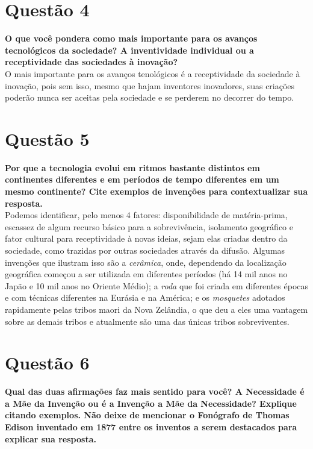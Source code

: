 
\section{Questão 4}
\label{sec:q4}
\textbf{O que você pondera como mais importante para os avanços tecnológicos da sociedade? A inventividade individual ou a receptividade das sociedades à inovação?} \\

O mais importante para os avanços tenológicos é a receptividade da sociedade à inovação, pois sem isso, mesmo que hajam inventores inovadores, suas criações poderão nunca ser aceitas pela sociedade e se perderem no decorrer do tempo.


\section{Questão 5}
\label{sec:q5}
\textbf{Por que a tecnologia evolui em ritmos bastante distintos em continentes diferentes e em períodos de tempo diferentes em um mesmo continente? Cite exemplos de invenções para contextualizar sua resposta.} \\

Podemos identificar, pelo menos 4 fatores: disponibilidade de matéria-prima, escassez de algum recurso básico para a sobrevivência, isolamento geográfico e fator cultural para receptividade à novas ideias, sejam elas criadas dentro da sociedade, como trazidas por outras sociedades através da difusão. Algumas invenções que ilustram isso são a \textit{cerâmica}, onde, dependendo da localização geográfica começou a ser utilizada em diferentes períodos (há 14 mil anos no Japão e 10 mil anos no Oriente Médio); a \textit{roda} que foi criada em diferentes épocas e com técnicas diferentes na Eurásia e na América; e os \textit{mosquetes} adotados rapidamente pelas tribos maori da Nova Zelândia, o que deu a eles uma vantagem sobre as demais tribos e atualmente são uma das únicas tribos sobreviventes.


\section{Questão 6}
\label{sec:q6}
\textbf{Qual das duas afirmações faz mais sentido para você? A Necessidade é a Mãe da Invenção ou é a Invenção a Mãe da Necessidade? Explique citando exemplos. Não deixe de mencionar o Fonógrafo de Thomas Edison inventado em 1877 entre os inventos a serem destacados para explicar sua resposta.} \\

